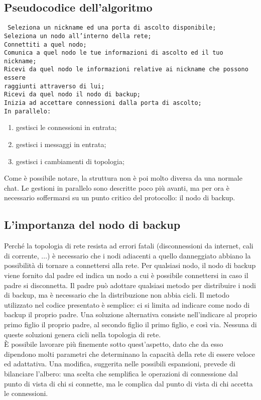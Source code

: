 \documentclass[10pt]{article} %
\begin{document}
\subsection{Pseudocodice dell'algoritmo}
{ \tt
Seleziona un nickname ed una porta di ascolto disponibile; \\
Seleziona un nodo all'interno della rete; \\
Connettiti a quel nodo; \\
Comunica a quel nodo le tue informazioni di ascolto ed il tuo nickname; \\
Ricevi da quel nodo le informazioni relative ai nickname che possono essere\\ raggiunti attraverso di lui; \\
Ricevi da quel nodo il nodo di backup; \\
Inizia ad accettare connessioni dalla porta di ascolto;\\
In parallelo:
\begin{enumerate}
	\item gestisci le connessioni in entrata;
	\item gestisci i messaggi in entrata;
	\item gestisci i cambiamenti di topologia;
\end{enumerate}
}
Come è possibile notare, la struttura non è poi molto diversa da una normale chat. Le gestioni in parallelo sono descritte poco più avanti, ma per ora è necessario soffermarsi su un punto critico del protocollo: il nodo di backup.


\subsection{L'importanza del nodo di backup}
Perché la topologia di rete resista ad errori fatali (disconnessioni da internet, cali di corrente, ...) è necessario che i nodi adiacenti a quello danneggiato abbiano la possibilità di tornare a connettersi alla rete. Per qualsiasi nodo, il nodo di backup viene fornito dal padre ed indica un nodo a cui è possibile connettersi in caso il padre si disconnetta. Il padre può adottare qualsiasi metodo per distribuire i nodi di backup, ma è necessario che la distribuzione non abbia cicli. Il metodo utilizzato nel codice presentato è semplice: ci si limita ad indicare come nodo di backup il proprio padre. Una soluzione alternativa consiste nell'indicare al proprio primo figlio il proprio padre, al secondo figlio il primo figlio, e così via. Nessuna di queste soluzioni genera cicli nella topologia di rete.\\
\`E possibile lavorare più finemente sotto quest'aspetto, dato che da esso dipendono molti parametri che determinano la capacità della rete di essere veloce ed adattativa. Una modifica, suggerita nelle possibili espansioni, prevede di bilanciare l'albero: una scelta che semplifica le operazioni di connessione dal punto di vista di chi si connette, ma le complica dal punto di vista di chi accetta le connessioni.
\end{document}
